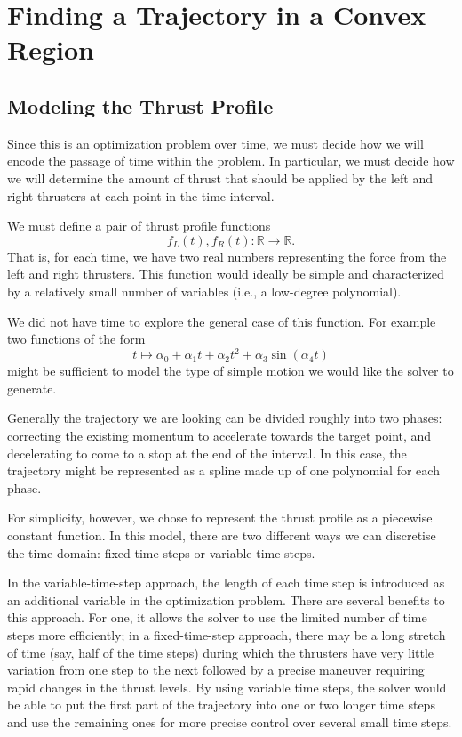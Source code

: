 \documentclass{report}
\begin{document}

\chapter{Finding a Trajectory in a Convex Region}
\section{Modeling the Thrust Profile}
Since this is an optimization problem over time, we must decide how we will encode
the passage of time within the problem. In particular, we must decide how we will
determine the amount of thrust that should be applied by the left and right thrusters
at each point in the time interval.

We must define a pair of thrust profile functions
\[ f_L(t), f_R(t) : \mathbb{R} \to \mathbb{R}. \]
That is, for each time, we have two real numbers representing the force from the left and right
thrusters.
This function would ideally be simple and characterized by a relatively small number of variables (i.e.,
a low-degree polynomial).

We did not have time to explore the general case of this function. For example two functions of the form
\[ t \mapsto \alpha_0 + \alpha_1 t + \alpha_2 t^2 + \alpha_3 \sin(\alpha_4 t) \]
might be sufficient to model the type of simple motion we would like the solver to generate.

Generally the trajectory we are looking can be divided roughly into
two phases: correcting the existing momentum to accelerate towards the target point, and 
decelerating to come to a stop at the end of the interval. In this case, the trajectory
might be represented as a spline made up of one polynomial for each phase.

For simplicity, however, we chose to represent the thrust profile as a piecewise constant
function. In this model, there are two different ways we can discretise the time domain:
fixed time steps or variable time steps.

In the variable-time-step approach, the length of each time step is introduced as an additional
variable in the optimization problem. There are several benefits to this approach.
For one, it allows the solver to use the limited number of time steps more efficiently; in a
fixed-time-step approach, there may be a long stretch of time (say, half of the time steps)
during which the thrusters have very little variation from one step to the next followed by a
precise maneuver requiring rapid changes in the thrust levels. By using variable time steps,
the solver would be able to put the first part of the trajectory into one or two longer time steps
and use the remaining ones for more precise control over several small time steps.
\end{document}
